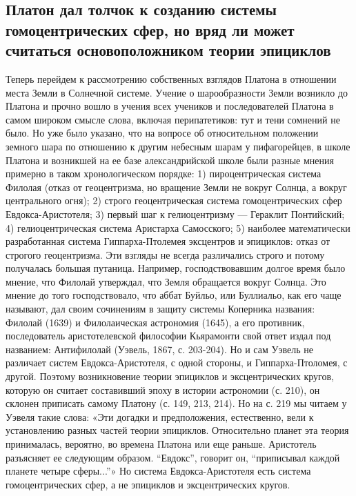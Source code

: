 \subsection{Платон дал толчок к созданию системы гомоцентрических
сфер, но вряд ли может считаться основоположником теории эпициклов}

Теперь перейдем к рассмотрению собственных взглядов Платона в
отношении места Земли в Солнечной системе. Учение о шарообразности
Земли возникло до Платона и прочно вошло в учения всех учеников и
последователей Платона в самом широком смысле слова, включая
перипатетиков: тут и тени сомнений не было. Но уже было указано, что
на вопросе об относительном положении земного шара по отношению к
другим небесным шарам у пифагорейцев, в школе Платона и возникшей на
ее базе александрийской школе были разные мнения примерно в таком
хронологическом порядке: 1) пироцентрическая система Филолая (отказ от
геоцентризма, но вращение Земли не вокруг Солнца, а вокруг
центрального огня); 2) строго геоцентрическая система гомоцентрических
сфер Евдокса-Аристотеля; 3) первый шаг к гелиоцентризму --- Гераклит
Понтийский; 4) гелиоцентрическая система Аристарха Самосского; 5)
наиболее математически разработанная система Гиппарха-Птолемея
эксцентров и эпициклов: отказ от строгого геоцентризма. Эти взгляды не
всегда различались строго и потому получалась большая путаница.
Например, господствовавшим долгое время было мнение, что Филолай
утверждал, что Земля обращается вокруг Солнца. Это мнение до того
господствовало, что аббат Буйльо, или Буллиальо, как его чаще
называют, дал своим сочинениям в защиту системы Коперника названия:
Филолай (1639) и Филолаическая астрономия (1645), а его противник,
последователь аристотелевской философии Кьярамонти свой ответ издал
под названием: Антифилолай (Уэвель, 1867, с. 203-204). Но и сам Уэвель
не различает систем Евдокса-Аристотеля, с одной стороны, и
Гиппарха-Птоломея, с другой. Поэтому возникновение теории эпициклов и
эксцентрических кругов, которую он считает составивший эпоху в истории
астрономии (с. 210), он склонен приписать самому Платону (с. 149, 213,
214). Но на с. 219 мы читаем у Уэвеля такие слова: «Эти догадки и
предположения, естественно, вели к установлению разных частей теории
эпициклов. Относительно планет эта теория принималась, вероятно, во
времена Платона или еще раньше. Аристотель разъясняет ее следующим
образом. ``Евдокс'', говорит он, ``приписывал каждой планете четыре
сферы...''» Но система Евдокса-Аристотеля есть система
гомоцентрических сфер, а не эпициклов и эксцентрических кругов.

